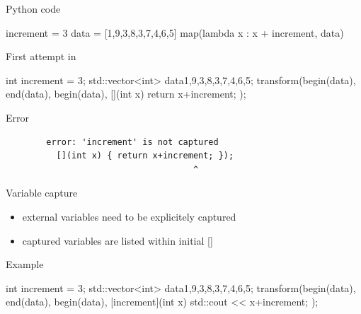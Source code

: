 \begin{frame}[fragile]
  \begin{block}{Python code}
    \begin{pythoncode*}{}
      increment = 3
      data = [1,9,3,8,3,7,4,6,5]
      map(lambda x : x + increment, data)
    \end{pythoncode*}
  \end{block}
  \pause
  \begin{block}{First attempt in \cpp}
    \begin{cppcode}
      int increment = 3;
      std::vector<int> data{1,9,3,8,3,7,4,6,5};
      transform(begin(data), end(data), begin(data),
                [](int x) { return x+increment; });
    \end{cppcode}
  \end{block}
  \pause
  \begin{alertblock}{Error}
    \begin{verbatim}
        error: 'increment' is not captured
          [](int x) { return x+increment; });
                                     ^
    \end{verbatim}
  \end{alertblock}
\end{frame}

\begin{frame}[fragile]
  \begin{block}{Variable capture}
    \begin{itemize}
    \item external variables need to be explicitely captured
    \item captured variables are listed within initial []
    \end{itemize}
  \end{block}
  \pause
  \begin{exampleblock}{Example}
    \begin{cppcode*}{}
      int increment = 3;
      std::vector<int> data{1,9,3,8,3,7,4,6,5};
      transform(begin(data), end(data), begin(data),
                [increment](int x) {
                  std::cout << x+increment;
                });
    \end{cppcode*}
  \end{exampleblock}
\end{frame}

